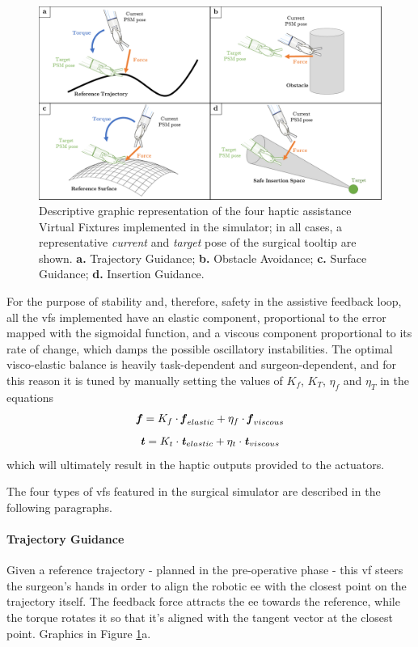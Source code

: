 \documentclass{article}
\newcommand{\vect}[1]{\textbf{\textit{#1}}}
\begin{document}
\begin{multicols}{2}
\begin{figure}
  \centering
      \includegraphics[width=\linewidth]{images/vfs_graphics.png}
      \caption{Descriptive graphic representation of the four haptic assistance Virtual Fixtures implemented in the simulator; in all cases, a representative \textit{current} and \textit{target} pose of the surgical tooltip are shown. \textbf{a.} Trajectory Guidance; \textbf{b.} Obstacle Avoidance; \textbf{c.} Surface Guidance; \textbf{d.} Insertion Guidance.}
      \label{fig:vfs_scheme}
\end{figure}

For the purpose of stability and, therefore, safety in the assistive feedback loop, all the \acp{vf} implemented have an elastic component, proportional to the error mapped with the sigmoidal function, and a viscous component proportional to its rate of change, which damps the possible oscillatory instabilities. The optimal visco-elastic balance is heavily task-dependent and surgeon-dependent, and for this reason it is tuned by manually setting the values of $K_f$, $K_T$, $\eta_f$ and $\eta_T$ in the equations
\begin{equation}
  \vect{f} = K_f\cdot\vect{f}_{elastic} + \eta_f\cdot\vect{f}_{viscous} 
  \label{eq:forcevfbalance}
\end{equation}
\begin{equation}
  \vect{t} = K_t\cdot\vect{t}_{elastic} + \eta_t\cdot\vect{t}_{viscous} 
  \label{eq:torquevfbalance}
\end{equation}    
which will ultimately result in the haptic outputs provided to the actuators.

The four types of \acp{vf} featured in the surgical simulator are described in the following paragraphs.
\paragraph{Trajectory Guidance} Given a reference trajectory - planned in the pre-operative phase - this \ac{vf} steers the surgeon's hands in order to align the robotic \ac{ee} with the closest point on the trajectory itself. The feedback force attracts the \ac{ee} towards the reference, while the torque rotates it so that it's aligned with the tangent vector at the closest point. Graphics in Figure \ref{fig:vfs_scheme}a.

\end{multicols}
\end{document}
